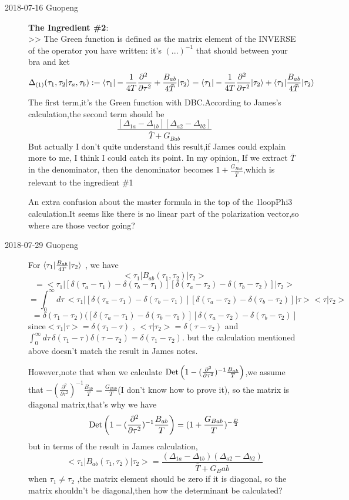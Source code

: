 \begin{description}
\item[2018-07-16 Guopeng]
{\bf The Ingredient \#2}: \\
>> The Green function is defined as the matrix element of the INVERSE of the operator you have written: it's $(...)^{-1}$ that should between your bra and ket\\
\[
\Delta_{(1)}(\tau_1,\tau_2|\tau_a,\tau_b)
:=\bra{\tau_1}-\frac{1}{4T}\frac{\partial^2~}{\partial\tau^2}
    +\frac{B_{ab}}{4\bar{T}}\ket{\tau_2}
=\bra{\tau_1}-\frac{1}{4T}\frac{\partial^2~}{\partial\tau^2}\ket{\tau_2}
+\bra{\tau_1}\frac{B_{ab}}{4\bar{T}}\ket{\tau_2}
\]
 The first term,it's the Green function with DBC.According to James's calculation,the second term should be
 \[
 \frac{[\Delta_{1a}-\Delta_{1b}][\Delta_{a2}-\Delta_{b2}]}{\bar{T}+G_{Bab}}
 \]
 But actually I don't quite understand this result,if James could explain more to me, I think I could catch its point.
 In my opinion, If we extract $\bar{T}$ in the denominator, then the denominator becomes $1+\frac{G_{Bab}}{\bar{T}}$,which
 is relevant to the ingredient \#1

An extra confusion about the master formula in the top of the 1loopPhi3  calculation.It seems like there is no linear part
of the polarization vector,so where are those vector going?

\item[2018-07-29 Guopeng]
For $\bra{\tau_1}\frac{B_{ab}}{4\bar{T}}\ket{\tau_2}$ , we have 
\[
<\tau_1|B_{ab}(\tau_1,\tau_2)|\tau_2>
\]
\[=<\tau_1|[\delta(\tau_a-\tau_1)-\delta(\tau_b-\tau_1)][\delta(\tau_a-\tau_2)-\delta(\tau_b-\tau_2)]|\tau_2>
\]
\[
=\int_0^\infty \! d\tau \,<\tau_1|[\delta(\tau_a-\tau_1)-\delta(\tau_b-\tau_1)][\delta(\tau_a-\tau_2)-\delta(\tau_b-\tau_2)]|\tau><\tau|\tau_2>
\]
\[
=\delta(\tau_1-\tau_2)([\delta(\tau_a-\tau_1)-\delta(\tau_b-\tau_1)][\delta(\tau_a-\tau_2)-\delta(\tau_b-\tau_2)]
\]
since$<\tau_1|\tau>=\delta(\tau_1-\tau)$ , $<\tau|\tau_2>=\delta(\tau-\tau_2)$ and$ \int_0^\infty \! d\tau \,\delta(\tau_1-\tau)\delta(\tau-\tau_2)=\delta(\tau_1-\tau_2)$.
but the calculation mentioned above doesn't match the result in James notes.

However,note that when we calculate $\mbox{\rm Det}\,\!\left(1-(\frac{\partial^2}{\partial\tau^2})^{-1}\frac{B_{ab}}{T}\right)$,we assume that $-(\frac{\partial^2}{\partial\tau^2})^{-1}\frac{B_{ab}}{T}=\frac{G_{Bab}}{T}$(I don't know how to prove it),
so the matrix is diagonal matrix,that's why we have
\[
\mbox{\rm Det}\,\!\left(1-(\frac{\partial^2}{\partial\tau^2})^{-1}\frac{B_{ab}}{T}\right)=(1+\frac{G_{Bab}}{T})^{-\frac{D}{2}}
\]
but in terms of the result in James calculation, 
\[
<\tau_1|B_{ab}(\tau_1,\tau_2)|\tau_2>=\frac{(\Delta_{1a}-\Delta_{1b})(\Delta_{a2}-\Delta_{b2})}{\bar{T}+G_Bab}
\]
when $\tau_1\neq\tau_2$ ,the matrix element should be zero if it is diagonal, so the matrix shouldn't be diagonal,then how the determinant be calculated?








\end{description}

\printbibliography[heading=subbibintoc,title={References}]


\renewcommand{\ssp}{a}
